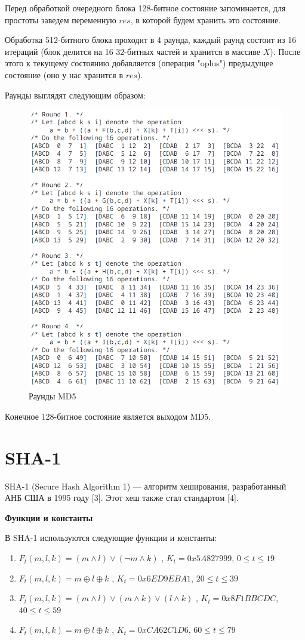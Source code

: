 \documentclass[colorthm]{./civarticle}
\begin{document}
Перед обработкой очередного блока 128-битное состояние запоминается, для простоты заведем переменную $res$, в которой будем хранить это состояние.

Обработка 512-битного блока проходит в 4 раунда, каждый раунд состоит из 16 итераций (блок делится на 16 32-битных частей и хранится в массиве $X$). После этого к текущему состоянию добавляется (операция "oplus") предыдущее состояние (оно у нас хранится в $res$).

Раунды выглядят следующим образом:

\begin{figure}[H]
    \centering
    \includegraphics[width=0.5\linewidth]{md5.png}
    \caption{Раунды MD5}
    \label{fig:enter-label}
\end{figure}

Конечное 128-битное состояние является выходом MD5.


\section{SHA-1}

SHA-1 (Secure Hash Algorithm 1) — алгоритм хеширования, разработанный АНБ США в 1995 году [3]. Этот хеш также стал стандартом [4].

\textbf{Функции и константы}

В SHA-1 используются следующие функции и константы:

\begin{enumerate}
    \item $F_t(m, l, k)=(m \wedge l) \vee(\neg m \wedge k)$ , $K_t = 0x5A827999$, $0 \leq t \leq 19$
    \item $F_t(m, l, k)=m \oplus l \oplus k$ , $K_t = 0x6ED9EBA1$, $20 \leq t \leq 39$
    \item $F_t(m, l, k)=(m \wedge l) \vee(m \wedge k) \vee(l \wedge k)$ , $K_t = 0x8F1BBCDC$, $40 \leq t \leq 59$
    \item $F_t(m, l, k)=m \oplus l \oplus k$ , $K_t = 0xCA62C1D6$, $60 \leq t \leq 79$
\end{enumerate}
\end{document}
